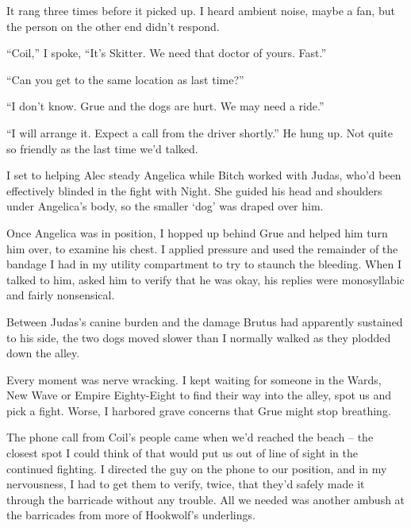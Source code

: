 It rang three times before it picked up.  I heard ambient noise, maybe a fan, but the person on the other end didn't respond.



``Coil,'' I spoke, ``It's Skitter.  We need that doctor of yours.  Fast.''



``Can you get to the same location as last time?''



``I don't know.  Grue and the dogs are hurt.  We may need a ride.''



``I will arrange it.  Expect a call from the driver shortly.''  He hung up.  Not quite so friendly as the last time we'd talked.



I set to helping Alec steady Angelica while Bitch worked with Judas, who'd been effectively blinded in the fight with Night.   She guided his head and shoulders under Angelica's body, so the smaller `dog' was draped over him.



Once Angelica was in position, I hopped up behind Grue and helped him turn him over, to examine his chest.  I applied pressure and used the remainder of the bandage I had in my utility compartment to try to staunch the bleeding.  When I talked to him, asked him to verify that he was okay, his replies were monosyllabic and fairly nonsensical.



Between Judas's canine burden and the damage Brutus had apparently sustained to his side, the two dogs moved slower than I normally walked as they plodded down the alley.



Every moment was nerve wracking.  I kept waiting for someone in the Wards, New Wave or Empire Eighty-Eight to find their way into the alley, spot us and pick a fight.  Worse, I harbored grave concerns that Grue might stop breathing.



The phone call from Coil's people came when we'd reached the beach – the closest spot I could think of that would put us out of line of sight in the continued fighting.  I directed the guy on the phone to our position, and in my nervousness, I had to get them to verify, twice, that they'd safely made it through the barricade without any trouble.  All we needed was another ambush at the barricades from more of Hookwolf's underlings.




